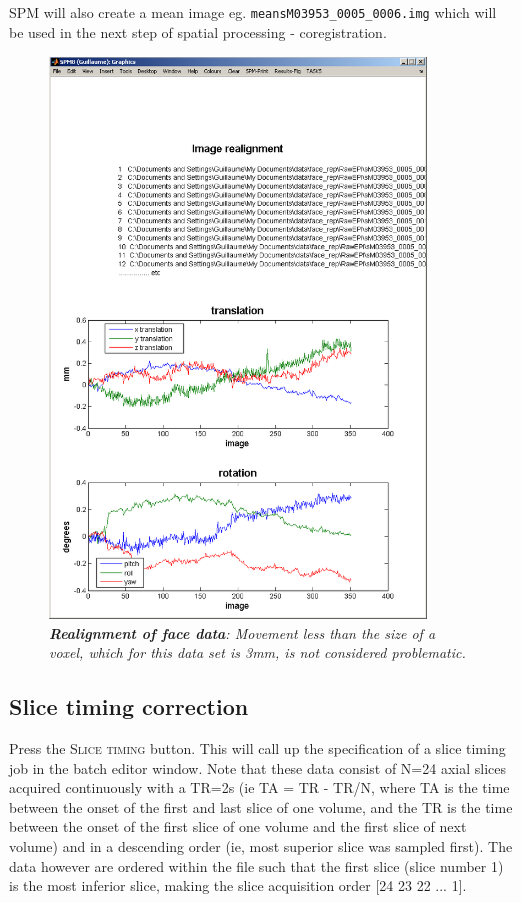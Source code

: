 SPM will also create a mean image eg. \texttt{meansM03953\_0005\_0006.img} which will be used in the next step of spatial processing - coregistration.
\begin{figure}
\begin{center}
\includegraphics[width=100mm]{faces/realign}
\caption{\em \textbf{Realignment of face data}: Movement less than the size of a voxel, which for this data set is 3mm, is not considered problematic. \label{face_realign}}
\end{center}
\end{figure}

\subsection{Slice timing correction}

Press the \textsc{Slice timing} button. This will call up the specification of a slice timing job in the batch editor window. Note that these data consist of N=24 axial slices acquired continuously with a TR=2s (ie TA = TR - TR/N, where TA is the time between the onset of the first and last slice of one volume, and the TR is the time between the onset of the first slice of one volume and the first slice of next volume) and in a descending order (ie, most superior slice was sampled first). The data however are ordered within the file such that the first slice (slice number 1) is the most inferior slice, making the slice acquisition order [24 23 22 ... 1].

